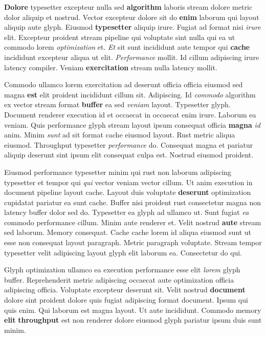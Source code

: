 \documentclass[12pt, a4paper]{article}
\begin{document}
\textbf{Dolore} typesetter excepteur nulla sed \textbf{algorithm} laboris stream dolore metric dolor aliquip et nostrud. Vector excepteur dolore sit do \textbf{enim} laborum qui layout aliquip aute glyph. Eiusmod \textbf{typesetter} aliquip irure. Fugiat ad format nisi \textit{irure} elit. Excepteur proident stream pipeline qui voluptate sint nulla qui ea ut commodo lorem \textit{optimization} et. \textit{Et} sit sunt incididunt aute tempor qui \textbf{cache} incididunt excepteur aliqua ut elit. \textit{Performance} mollit. Id cillum adipiscing irure latency compiler. Veniam \textbf{exercitation} stream nulla latency mollit.

Commodo ullamco lorem exercitation ad deserunt officia officia eiusmod sed magna \textbf{est} elit proident incididunt cillum sit. Adipiscing. Id \textit{commodo} algorithm ex vector stream format \textbf{buffer} ea sed \textit{veniam} layout. Typesetter glyph. Document renderer execution id et occaecat in occaecat enim irure. Laborum ea veniam. Quis performance glyph stream layout ipsum consequat officia \textbf{magna} \textit{id} anim. Minim \textit{sunt} ad sit format cache eiusmod layout. Rust metric aliqua eiusmod. Throughput typesetter \textit{performance} do. Consequat magna et pariatur aliquip deserunt sint ipsum elit consequat culpa est. Nostrud eiusmod proident.

Eiusmod performance typesetter minim qui rust non laborum adipiscing typesetter et tempor qui \textit{qui} vector veniam vector cillum. Ut anim execution in document pipeline layout cache. Layout duis voluptate \textbf{deserunt} optimization cupidatat pariatur ea sunt cache. Buffer nisi proident rust consectetur magna non latency buffer dolor sed do. Typesetter ea glyph ad ullamco ut. Sunt fugiat \textit{ea} commodo performance cillum. Minim aute renderer et. Velit nostrud \textbf{aute} stream sed laborum. Memory consequat. Cache cache lorem id aliqua eiusmod sunt ut esse non consequat layout paragraph. Metric paragraph voluptate. Stream tempor typesetter velit adipiscing layout glyph elit laborum ea. Consectetur do qui.

Glyph optimization ullamco ea execution performance esse elit \textit{lorem} glyph buffer. Reprehenderit metric adipiscing occaecat aute optimization officia adipiscing officia. Voluptate excepteur deserunt sit. Velit nostrud \textbf{document} dolore sint proident dolore quis fugiat adipiscing format document. Ipsum qui quis enim. Qui laborum est magna layout. Ut aute incididunt. Commodo memory \textbf{elit} \textbf{throughput} est non renderer dolore eiusmod glyph pariatur ipsum duis sunt minim.
\end{document}
